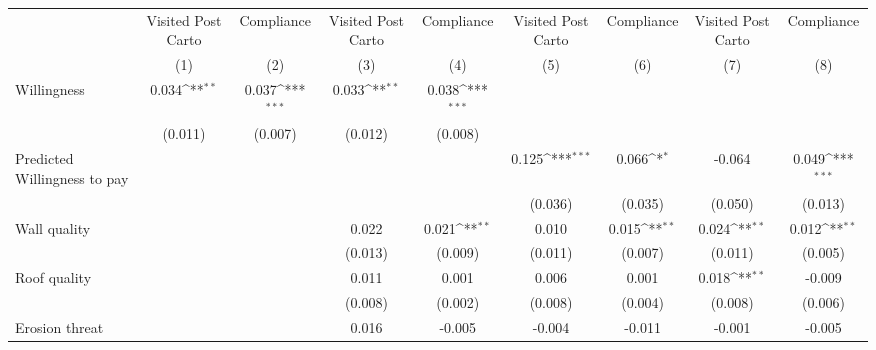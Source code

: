 {
\def\sym#1{\ifmmode^{#1}\else\(^{#1}\)\fi}
\begin{tabular}{l*{8}{c}}
\toprule
                &\multicolumn{1}{c}{Visited Post Carto}&\multicolumn{1}{c}{Compliance}&\multicolumn{1}{c}{Visited Post Carto}&\multicolumn{1}{c}{Compliance}&\multicolumn{1}{c}{Visited Post Carto}&\multicolumn{1}{c}{Compliance}&\multicolumn{1}{c}{Visited Post Carto}&\multicolumn{1}{c}{Compliance}\\
                &\multicolumn{1}{c}{(1)}         &\multicolumn{1}{c}{(2)}         &\multicolumn{1}{c}{(3)}         &\multicolumn{1}{c}{(4)}         &\multicolumn{1}{c}{(5)}         &\multicolumn{1}{c}{(6)}         &\multicolumn{1}{c}{(7)}         &\multicolumn{1}{c}{(8)}         \\
\midrule
Willingness     &    0.034\sym{**} &    0.037\sym{***}&    0.033\sym{**} &    0.038\sym{***}&                  &                  &                  &                  \\
                &  (0.011)         &  (0.007)         &  (0.012)         &  (0.008)         &                  &                  &                  &                  \\
Predicted Willingness to pay&                  &                  &                  &                  &    0.125\sym{***}&    0.066\sym{*}  &   -0.064         &    0.049\sym{***}\\
                &                  &                  &                  &                  &  (0.036)         &  (0.035)         &  (0.050)         &  (0.013)         \\
Wall quality    &                  &                  &    0.022         &    0.021\sym{**} &    0.010         &    0.015\sym{**} &    0.024\sym{**} &    0.012\sym{**} \\
                &                  &                  &  (0.013)         &  (0.009)         &  (0.011)         &  (0.007)         &  (0.011)         &  (0.005)         \\
Roof quality    &                  &                  &    0.011         &    0.001         &    0.006         &    0.001         &    0.018\sym{**} &   -0.009         \\
                &                  &                  &  (0.008)         &  (0.002)         &  (0.008)         &  (0.004)         &  (0.008)         &  (0.006)         \\
Erosion threat  &                  &                  &    0.016         &   -0.005         &   -0.004         &   -0.011         &   -0.001         &   -0.005         \\

\end{tabular}}
